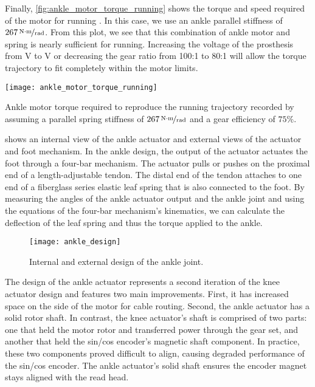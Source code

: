 Finally, \cref{fig:ankle_motor_torque_running} shows the torque and speed
required of the motor for running \citep{novacheck1998biomechanics}. In this
case, we use an ankle parallel stiffness of $\unitfrac[267]{N \cdot m}{rad}$.
From this plot, we see that this combination of ankle motor and spring is nearly
sufficient for running. Increasing the voltage of the prosthesis from
\unit[48]{V} to \unit[60]{V} or decreasing the gear ratio from 100:1 to 80:1
will allow the torque trajectory to fit completely within the motor limits. 
\begin{marginfigure}[-0in]
    \centering 
    \texttt{[image: ankle\_motor\_torque\_running]}
    \caption{Ankle motor torque required to reproduce the running trajectory
    recorded by \citet{novacheck1998biomechanics} assuming a parallel spring
    stiffness of $\unitfrac[267]{N \cdot m}{rad}$ and a gear efficiency of
    $75\%$.
    }\label{fig:ankle_motor_torque_running}
\end{marginfigure}

 shows an internal view of the ankle actuator and
external views of the actuator and foot mechanism. In the ankle design, the
output of the actuator actuates the foot through a four-bar mechanism. The
actuator pulls or pushes on the proximal end of a length-adjustable tendon. The
distal end of the tendon attaches to one end of a fiberglass series elastic leaf
spring that is also connected to the foot. By measuring the angles of the ankle
actuator output and the ankle joint and using the equations of the four-bar
mechanism's kinematics, we can calculate the deflection of the leaf spring and
thus the torque applied to the ankle.
\begin{figure*}[b!]
    \centering 
    \texttt{[image: ankle\_design]}
    \caption{Internal and external design of the ankle 
    joint.}\label{fig:ankle_design}
\end{figure*}

The design of the ankle actuator represents a second iteration of the knee
actuator design and features two main improvements.  First, it has increased
space on the side of the motor for cable routing. Second, the ankle actuator has
a solid rotor shaft. In contrast, the knee actuator's shaft is comprised of two
parts: one that held the motor rotor and transferred power through the gear set,
and another that held the sin/cos encoder's magnetic shaft component. In
practice, these two components proved difficult to align, causing degraded
performance of the sin/cos encoder. The ankle actuator's solid shaft ensures the
encoder magnet stays aligned with the read head.

